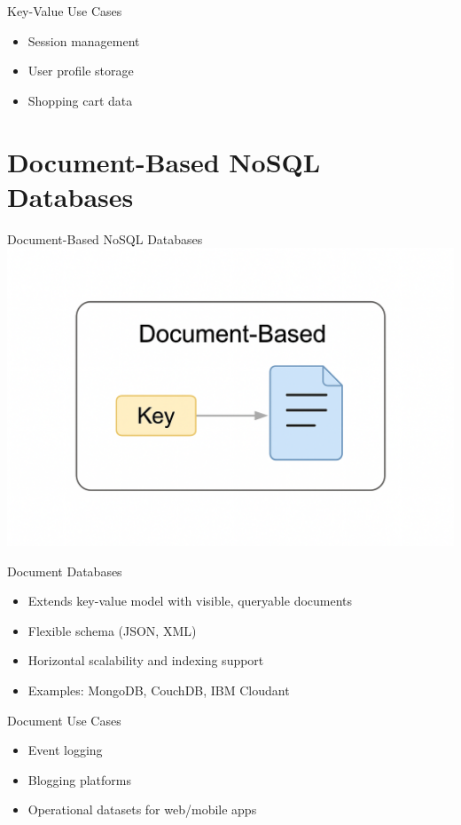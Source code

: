 \documentclass[aspectratio=169]{beamer}
\begin{document}
\begin{frame}{Key-Value Use Cases}
\begin{itemize}
    \item Session management
    \item User profile storage
    \item Shopping cart data
\end{itemize}
\end{frame}

\section{Document-Based NoSQL Databases}

\begin{frame}{\centering Document-Based NoSQL Databases}
\centering
\includegraphics[width=0.6\linewidth]{figures/document_db_diagram}
\end{frame}

\begin{frame}{Document Databases}
\begin{itemize}
    \item Extends key-value model with visible, queryable documents
    \item Flexible schema (JSON, XML)
    \item Horizontal scalability and indexing support
    \item Examples: MongoDB, CouchDB, IBM Cloudant
\end{itemize}
\end{frame}

\begin{frame}{Document Use Cases}
\begin{itemize}
    \item Event logging
    \item Blogging platforms
    \item Operational datasets for web/mobile apps
\end{itemize}
\end{frame}
\end{document}
